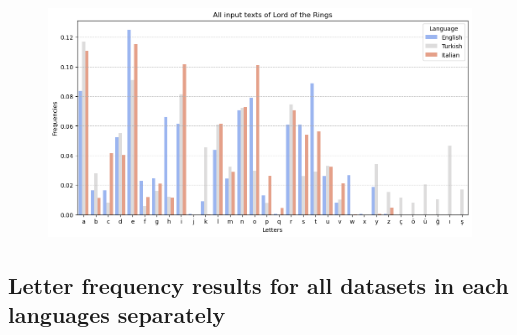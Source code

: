 \begin{figure}[h]
    \centering
    \includegraphics[width=1\textwidth]{media/allLordOfTheRings.png}
\end{figure}

\newpage

\subsection*{Letter frequency results for all datasets in each languages separately} 

